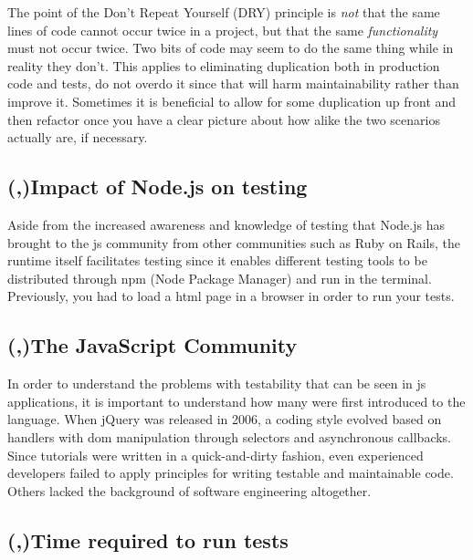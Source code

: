 \documentclass[11pt]{article}
\begin{document}
The point of the Don't Repeat Yourself (DRY) principle is \emph{not} that the same lines of code cannot occur twice in a project, but that the same \emph{functionality} must not occur twice. Two bits of code may seem to do the same thing while in reality they don't. This applies to eliminating duplication both in production code and tests, do not overdo it since that will harm maintainability rather than improve it. Sometimes it is beneficial to allow for some duplication up front and then refactor once you have a clear picture about how alike the two scenarios actually are, if necessary. \cite[questions~69-70]{Edelstam}

\subsection{(,)Impact of Node.js on testing}

Aside from the increased awareness and knowledge of testing that Node.js has brought to the \gls{js} community from other communities such as Ruby on Rails, the runtime itself facilitates testing since it enables different testing tools to be distributed through npm (Node Package Manager) and run in the terminal. Previously, you had to load a html page in a browser in order to run your tests. \cite[question~9]{Stenmark}

\subsection{(,)The JavaScript Community}

In order to understand the problems with testability that can be seen in \gls{js} applications, it is important to understand how many were first introduced to the language. When jQuery was released in 2006, a coding style evolved based on handlers with \gls{dom} manipulation through selectors and asynchronous callbacks. Since tutorials were written in a quick-and-dirty fashion, even experienced developers failed to apply principles for writing testable and maintainable code. Others lacked the background of software engineering altogether. \cite[question~10]{Stenmark}

\subsection{(,)Time required to run tests}
\end{document}

